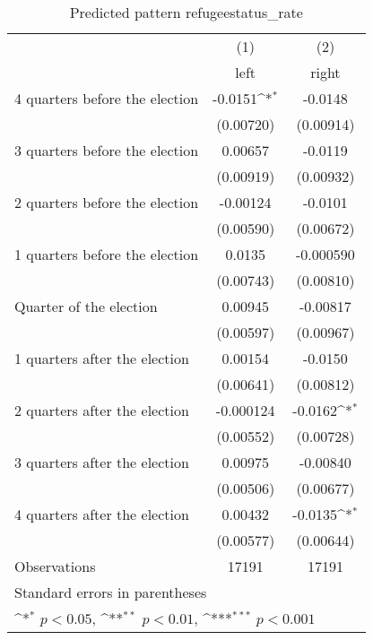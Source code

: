 \begin{table}[htbp]\centering
\def\sym#1{\ifmmode^{#1}\else\(^{#1}\)\fi}
\caption{Predicted pattern refugeestatus\_rate}
\begin{tabular}{l*{2}{c}}
\hline\hline
                    &\multicolumn{1}{c}{(1)}&\multicolumn{1}{c}{(2)}\\
                    &\multicolumn{1}{c}{left}&\multicolumn{1}{c}{right}\\
\hline
 4 quarters before the election&     -0.0151\sym{*}  &     -0.0148         \\
                    &   (0.00720)         &   (0.00914)         \\
[1em]
 3 quarters before the election&     0.00657         &     -0.0119         \\
                    &   (0.00919)         &   (0.00932)         \\
[1em]
 2 quarters before the election&    -0.00124         &     -0.0101         \\
                    &   (0.00590)         &   (0.00672)         \\
[1em]
 1 quarters before the election&      0.0135         &   -0.000590         \\
                    &   (0.00743)         &   (0.00810)         \\
[1em]
Quarter of the election&     0.00945         &    -0.00817         \\
                    &   (0.00597)         &   (0.00967)         \\
[1em]
 1 quarters after the election&     0.00154         &     -0.0150         \\
                    &   (0.00641)         &   (0.00812)         \\
[1em]
 2 quarters after the election&   -0.000124         &     -0.0162\sym{*}  \\
                    &   (0.00552)         &   (0.00728)         \\
[1em]
 3 quarters after the election&     0.00975         &    -0.00840         \\
                    &   (0.00506)         &   (0.00677)         \\
[1em]
 4 quarters after the election&     0.00432         &     -0.0135\sym{*}  \\
                    &   (0.00577)         &   (0.00644)         \\
\hline
Observations        &       17191         &       17191         \\
\hline\hline
\multicolumn{3}{l}{\footnotesize Standard errors in parentheses}\\
\multicolumn{3}{l}{\footnotesize \sym{*} \(p<0.05\), \sym{**} \(p<0.01\), \sym{***} \(p<0.001\)}\\
\end{tabular}
\end{table}
